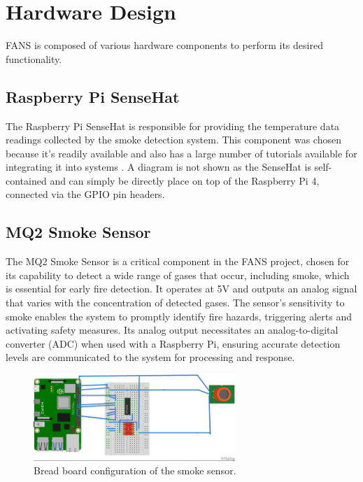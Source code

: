 \section{Hardware Design}

FANS is composed of various hardware components to perform its desired functionality.

\subsection{Raspberry Pi SenseHat}

The Raspberry Pi SenseHat is responsible for providing the temperature data readings collected by the smoke detection
system. This component was chosen because it's readily available and also has a large number of tutorials available for
integrating it into systems \cite{sensehat}. A diagram is not shown as the SenseHat is self-contained and can simply be
directly place on top of the Raspberry Pi 4, connected via the GPIO pin headers.

\subsection{MQ2 Smoke Sensor}

The MQ2 Smoke Sensor is a critical component in the FANS project, chosen for its capability to detect a wide range of
gases that occur, including smoke, which is essential for early fire detection. It operates at 5V and outputs an analog
signal that varies with the concentration of detected gases. The sensor's sensitivity to smoke enables the system to
promptly identify fire hazards, triggering alerts and activating safety measures. Its analog output necessitates an
analog-to-digital converter (ADC) when used with a Raspberry Pi, ensuring accurate detection levels are communicated to
the system for processing and response.

\begin{figure}[H]
    \centering
    \includegraphics[width=3in]{../assets/MQ2SensorBB.png}
    \caption{Bread board configuration of the smoke sensor.}
\end{figure}

